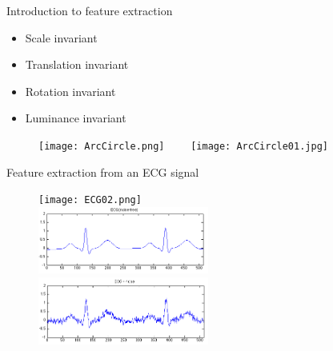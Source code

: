 \begin{frame}{Introduction to feature extraction}
\begin{itemize}
\item Scale invariant
\item Translation invariant
\item Rotation invariant
\item Luminance invariant
\end{itemize}
\vspace{-12pt}
\begin{figure}
\texttt{[image: ArcCircle.png]}~~~~
\texttt{[image: ArcCircle01.jpg]}
\end{figure}
\end{frame}

\begin{frame}{Feature extraction from an ECG signal}
\begin{figure}
\texttt{[image: ECG02.png]}\\
\includegraphics[width = 0.5\textwidth]{Figures/ECG01a.png}~~~
\includegraphics[width = 0.5\textwidth]{Figures/ECG01b.png}
\end{figure}
\end{frame}

